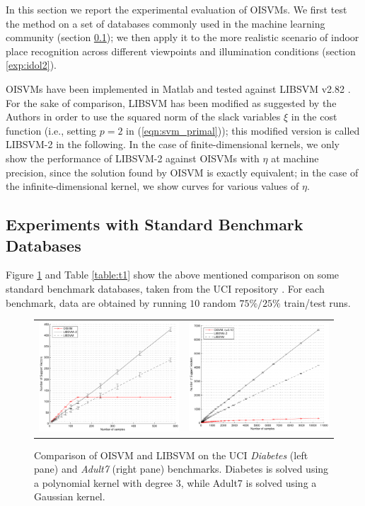 In this section we report the experimental evaluation of OISVMs. We
first test the method on a set of databases commonly used in the
machine learning community (section \ref{exp:ml}); we then apply it to
the more realistic scenario of indoor place recognition across
different viewpoints and illumination conditions (section
\ref{exp:idol2}).

OISVMs have been implemented in Matlab and tested against LIBSVM v2.82
\cite{ChangL01}. For the sake of comparison, LIBSVM has been modified
as suggested by the Authors in order to use the squared norm of the
slack variables $\xi$ in the cost function (i.e., setting $p=2$ in
(\ref{eqn:svm_primal})); this modified version is called LIBSVM-2 in the
following. In the case of finite-dimensional kernels, we only show the
performance of LIBSVM-2 against OISVMs with $\eta$ at machine
precision, since the solution found by OISVM is exactly equivalent; in
the case of the infinite-dimensional kernel, we show curves for
various values of $\eta$.

\subsection{Experiments with Standard Benchmark Databases}
\label{exp:ml}

Figure \ref{fig:ad7} and Table \ref{table:t1} show the above mentioned
comparison on some standard benchmark databases, taken from the UCI
repository \cite{Newman+Hettich+Blake+Merz:1998}. For each benchmark,
data are obtained by running $10$ random $75\%/25\%$ train/test runs.

\begin{figure}[!ht]
  \centering \footnotesize
  \begin{tabular}{cc}
  \includegraphics[width=0.47\linewidth]{figs/results/finite_kernel.pdf} &
  \includegraphics[width=0.47\linewidth]{figs/results/adult7.pdf}
  \end{tabular}
  \caption{Comparison of OISVM and LIBSVM on the UCI \emph{Diabetes}
  (left pane) and \emph{Adult7} (right pane) benchmarks. Diabetes is
  solved using a polynomial kernel with degree $3$, while Adult7 is
  solved using a Gaussian kernel.}
\label{fig:ad7}
\end{figure}

